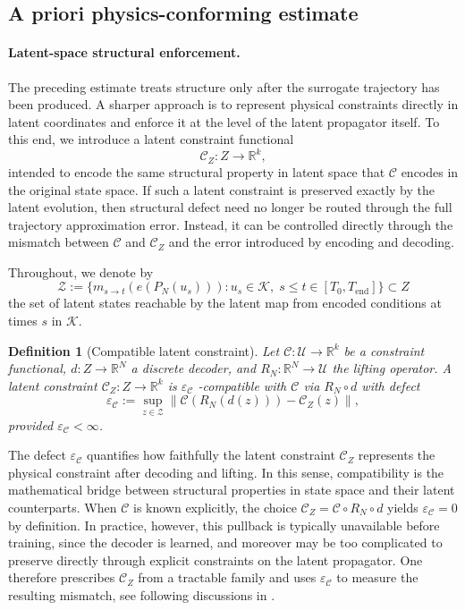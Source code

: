 \documentclass[a4paper,fleqn]{cas-sc}
\theoremstyle{thmstyleone}%
\theoremstyle{thmstyletwo}%
\theoremstyle{thmstylethree}%
\newtheorem{definition}{Definition}%
\begin{document}
\subsection{A priori physics-conforming estimate}\label{sec:aprioriConform}

\paragraph{Latent-space structural enforcement.}
The preceding estimate treats structure only after the surrogate trajectory has been produced. A sharper approach is to represent physical constraints directly in latent coordinates and enforce it at the level of the latent propagator itself. To this end, we introduce a latent constraint functional
\[
\mathcal C_Z : Z \to \mathbb R^k,
\]
intended to encode the same structural property in latent space that $\mathcal C$ encodes in the original state space. If such a latent constraint is preserved exactly by the latent evolution, then structural defect need no longer be routed through the full trajectory approximation error. Instead, it can be controlled directly through the mismatch between $\mathcal C$ and $\mathcal C_Z$ and the error introduced by encoding and decoding.

Throughout, we denote by
\[
\mathcal{Z} := \bigl\{ m_{s\to t}(e(P_N(u_s))) :
u_s\in\mathcal K,\;
s\le t\in[T_0,T_{\mathrm{end}}]
\bigr\}
\subset Z
\]
the set of latent states reachable by the latent map from encoded conditions at times $s$ in $\mathcal K$.

\begin{definition}[Compatible latent constraint]
\label{def:compatible}
Let $\mathcal{C} : \mathcal{U} \to \mathbb{R}^k$ be a constraint functional, $d : Z \to \mathbb{R}^N$ a discrete decoder, and $R_N : \mathbb{R}^N \to \mathcal{U}$ the lifting operator. A latent constraint
$\mathcal{C}_Z : Z \to \mathbb{R}^k$ is $\varepsilon_{\mathcal{C}}$ \emph{-compatible} with $\mathcal{C}$ via $R_N \circ d$ with defect
\[
\varepsilon_{\mathcal{C}}
:=
\sup_{z \in \mathcal{Z}}
\|\mathcal{C}(R_N(d(z))) - \mathcal{C}_Z(z)\|,
\]
provided $\varepsilon_{\mathcal{C}} < \infty$.
\end{definition}

The defect $\varepsilon_{\mathcal C}$ quantifies how faithfully the latent constraint $\mathcal C_Z$ represents the physical constraint after decoding and lifting. In this sense, compatibility is the mathematical bridge between structural properties in state space and their latent counterparts. When $\mathcal C$ is known explicitly, the choice $\mathcal C_Z = \mathcal C \circ R_N \circ d$ yields $\varepsilon_{\mathcal C}=0$ by definition. In practice, however, this pullback is typically unavailable before training, since the decoder is learned, and moreover may be too complicated to preserve directly through explicit constraints on the latent propagator. One therefore prescribes $\mathcal C_Z$ from a tractable family and uses $\varepsilon_{\mathcal C}$ to measure the resulting mismatch, see following discussions in .
\end{document}
